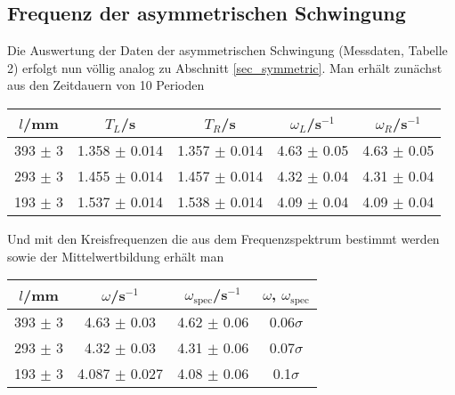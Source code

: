 \documentclass[12pt,a4paper,german]{scrartcl}
\numberwithin{equation}{section}
\begin{document}
  \subsection{Frequenz der asymmetrischen Schwingung}
  \label{sec_asymmetric}
  Die Auswertung der Daten der asymmetrischen Schwingung (Messdaten, Tabelle 2) erfolgt nun völlig analog zu Abschnitt \ref{sec_symmetric}. Man erhält zunächst aus den Zeitdauern von 10 Perioden

  \begin{center}
    \begin{tabular}{c|c|c|c|c}
      $l$/mm & $T_L$/s & $T_R$/s & $\omega_L$/s$^{-1}$ &$\omega_R$/s$^{-1}$ \\
      \hline
      393 $\pm$ 3 & 1.358 $\pm$ 0.014 & 1.357 $\pm$ 0.014 & 4.63 $\pm$ 0.05 & 4.63 $\pm$ 0.05 \\
      293 $\pm$ 3 & 1.455 $\pm$ 0.014 & 1.457 $\pm$ 0.014 & 4.32 $\pm$ 0.04 & 4.31 $\pm$ 0.04 \\
      193 $\pm$ 3 & 1.537 $\pm$ 0.014 & 1.538 $\pm$ 0.014 & 4.09 $\pm$ 0.04 & 4.09 $\pm$ 0.04
    \end{tabular}
    \label{table_asym_T_omega_left_right}
  \end{center}

  Und mit den Kreisfrequenzen die aus dem Frequenzspektrum bestimmt werden sowie der Mittelwertbildung erhält man

  \begin{center}
    \begin{tabular}{c|c|c|c}
      $l$/mm & $\omega$/s$^{-1}$ & $\omega_\text{spec}$/s$^{-1}$ & $\omega$, $\omega_\text{spec}$ \\
      \hline
      393 $\pm$ 3 & 4.63 $\pm$ 0.03   & 4.62 $\pm$ 0.06 & 0.06$\sigma$ \\
      293 $\pm$ 3 & 4.32 $\pm$ 0.03   & 4.31 $\pm$ 0.06 & 0.07$\sigma$ \\
      193 $\pm$ 3 & 4.087 $\pm$ 0.027 & 4.08 $\pm$ 0.06 & 0.1$\sigma$
    \end{tabular}
    \label{table_asym_omega}
  \end{center}
\end{document}
